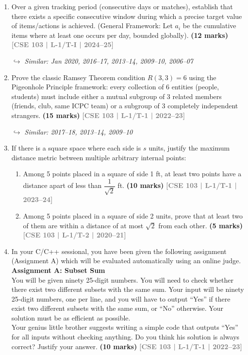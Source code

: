 \documentclass[12pt,a3paper]{article}
\newcommand{\yr}[1]{\hfill\textcolor{gray}{\small\textbf{[#1]}}}
\newcommand{\mk}[1]{\textcolor{orange!70!black}{\small\textbf{(#1 marks)}}}
\newcommand{\variant}[1]{\par\vspace{1pt}\textcolor{blue!50!black}%
  {\footnotesize\textit{$\hookrightarrow$ Similar: #1}}}
\begin{document}
\begin{enumerate}

\item Over a given tracking period (consecutive days or matches), establish that there exists a specific consecutive window during which a precise target value of items/actions is achieved. (General Framework: Let $a_i$ be the cumulative items where at least one occurs per day, bounded globally).
\mk{12} \yr{CSE 103 | L-1/T-I | 2024--25} \variant{Jan 2020, 2016--17, 2013--14, 2009--10, 2006--07}

\item Prove the classic Ramsey Theorem condition $R(3,3) = 6$ using the Pigeonhole Principle framework: every collection of 6 entities (people, students) must include either a mutual subgroup of 3 related members (friends, club, same ICPC team) or a subgroup of 3 completely independent strangers.
\mk{15} \yr{CSE 103 | L-1/T-1 | 2022--23} \variant{2017--18, 2013--14, 2009--10}

\item If there is a square space where each side is $s$ units, justify the maximum distance metric between multiple arbitrary internal points:
\begin{enumerate}
  \item Among 5 points placed in a square of side 1 ft, at least two points have a distance apart of less than $\dfrac{1}{\sqrt{2}}$ ft. \mk{10} \yr{CSE 103 | L-1/T-1 | 2023--24}
  \item Among 5 points placed in a square of side 2 units, prove that at least two of them are within a distance of at most $\sqrt{2}$ from each other. \mk{5} \yr{CSE 103 | L-1/T-2 | 2020--21}
\end{enumerate}

\item In your C/C++ sessional, you have been given the following assignment (Assignment A) which will be evaluated automatically using an online judge. \\[6pt]
\textbf{Assignment A: Subset Sum}\\
You will be given ninety 25-digit numbers. You will need to check whether there exist two different subsets with the same sum. Your input will be ninety 25-digit numbers, one per line, and you will have to output ``Yes'' if there exist two different subsets with the same sum, or ``No'' otherwise. Your solution must be as efficient as possible.\\[4pt]
Your genius little brother suggests writing a simple code that outputs ``Yes'' for all inputs without checking anything. Do you think his solution is always correct? Justify your answer.
\mk{10} \yr{CSE 103 | L-1/T-1 | 2022--23}


\end{enumerate}
\end{document}
